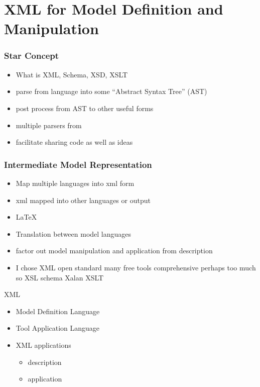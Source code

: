 \documentclass{beamer}
\begin{document}
\section{XML for  Model Definition and Manipulation}

\begin{frame}
  \frametitle{Star Concept}



  \begin{itemize}
  \item What is XML, Schema, XSD, XSLT
  \item parse from language into some ``Abstract Syntax Tree'' (AST)
  \item post process from AST to other useful forms
  \item multiple parsers from
  \item facilitate sharing code as well as ideas
  \end{itemize}

\end{frame}

  \begin{frame}
    \frametitle{Intermediate Model Representation}
    \begin{itemize}
    \item Map multiple languages into xml form
    \item xml mapped into other languages or output
    \item \LaTeX
\item  Translation between model languages
\item factor out model manipulation and application from description
\item I chose XML open standard many free tools comprehensive perhaps too much so  XSL schema Xalan XSLT
    \end{itemize}
  \end{frame}


\begin{frame}{XML }

  \begin{itemize}
  \item Model Definition Language
  \item Tool Application Language
\item XML applications
  \begin{itemize}
  \item description
  \item application
  \end{itemize}
  \end{itemize}

  
\end{frame}
\end{document}
